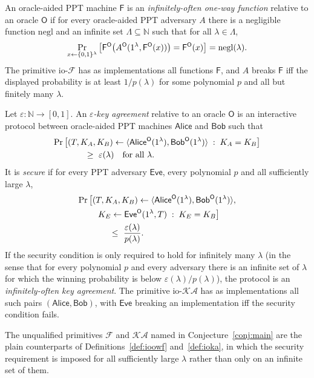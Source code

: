 \documentclass{aicr-conjecture}
\newcommand{\bits}{\{0,1\}}
\newcommand{\negl}{\mathrm{negl}}
\newcommand{\iopref}{\mathrm{io}\text{-}}
\newcommand{\Fc}{\mathcal{F}}
\newcommand{\KAc}{\mathcal{KA}}
\newcommand{\ioF}{\iopref\Fc}
\newcommand{\ioKA}{\iopref\KAc}
\newcommand{\Oc}{\mathsf{O}}
\newcommand{\Fs}{\mathsf{F}}
\newcommand{\Alice}{\mathsf{Alice}}
\newcommand{\Bob}{\mathsf{Bob}}
\newcommand{\Eve}{\mathsf{Eve}}
\newcommand{\FO}{\Fs^{\Oc}}
\newcommand{\kaexec}{\langle\Alice^{\Oc}(1^{\lambda}),\Bob^{\Oc}(1^{\lambda})\rangle}
\begin{document}
\begin{definition}\label{def:ioowf}
An oracle-aided PPT machine $\Fs$ is an \emph{infinitely-often one-way
function} relative to an oracle $\Oc$ if for every oracle-aided PPT
adversary $A$ there is a negligible function $\negl$ and an infinite set
$\Lambda\subseteq\mathbb N$ such that for all $\lambda\in\Lambda$,
\[
  \Pr_{x\sample\bits^{\lambda}}
    \big[\FO\big(A^{\Oc}(1^{\lambda},\FO(x))\big)=\FO(x)\big]
  =\negl(\lambda).
\]
The primitive $\ioF$ has as implementations all functions $\Fs$, and $A$
breaks $\Fs$ iff the displayed probability is at least $1/p(\lambda)$ for
some polynomial $p$ and all but finitely many $\lambda$.
\end{definition}

\begin{definition}\label{def:ioka}
Let $\varepsilon:\mathbb N\to[0,1]$. An \emph{$\varepsilon$-key
agreement} relative to an oracle $\Oc$ is an interactive protocol between
oracle-aided PPT machines $\Alice$ and $\Bob$ such that
\begin{align*}
  \Pr\big[&(T,K_A,K_B)\sample\kaexec \;:\; K_A=K_B\big]\\
    &\qquad\ge\ \varepsilon(\lambda)\quad\text{for all }\lambda .
\end{align*}
It is \emph{secure} if for every PPT adversary $\Eve$, every polynomial
$p$ and all sufficiently large $\lambda$,
\begin{align*}
  \Pr\big[&(T,K_A,K_B)\sample\kaexec,\\
    &\ \ K_E\sample\Eve^{\Oc}(1^{\lambda},T)\;:\;K_E=K_B\big]\\
    &\qquad\le\ \frac{\varepsilon(\lambda)}{p(\lambda)} .
\end{align*}
If the security condition is only required to hold for infinitely many
$\lambda$ (in the sense that for every polynomial $p$ and every adversary
there is an infinite set of $\lambda$ for which the winning probability
is below $\varepsilon(\lambda)/p(\lambda)$), the protocol is an
\emph{infinitely-often key agreement}. The primitive $\ioKA$ has as
implementations all such pairs $(\Alice,\Bob)$, with $\Eve$ breaking an
implementation iff the security condition fails.
\end{definition}

The unqualified primitives $\Fc$ and $\KAc$ named in
Conjecture~\ref{conj:main} are the plain counterparts of
Definitions~\ref{def:ioowf} and~\ref{def:ioka}, in which the security
requirement is imposed for all sufficiently large $\lambda$ rather than
only on an infinite set of them.
\end{document}
